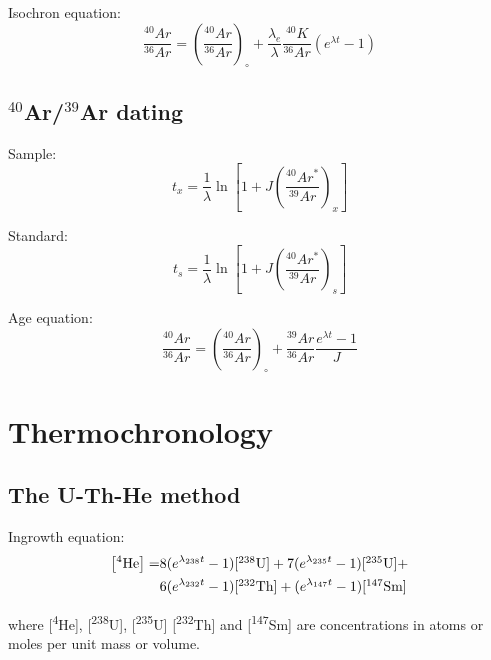 \documentclass{article}
\begin{document}
\begin{multicols}{3}
Isochron equation:
\begin{equation}
\frac{^{40}Ar}{^{36}Ar} = \left(\frac{^{40}Ar}{^{36}Ar}\right)_\circ +
\frac{\lambda_e}{\lambda} \frac{^{40}K}{^{36}Ar} \left( e^{\lambda t} - 1 \right)
\label{eq:K-Ar-isochron}
\end{equation}

\subsection{$^{40}$Ar/$^{39}$Ar dating}
\label{sec:Ar-Ar}

Sample:
\begin{equation}
t_x = \frac{1}{\lambda} \ln\left[
1 + J \left(\frac{^{40}Ar^*}{^{39}Ar}\right)_x 
\right]
\label{eq:Ar-Ar}
\end{equation}

Standard:
\begin{equation}
t_s = \frac{1}{\lambda} \ln\left[
1 + J \left(\frac{^{40}Ar^*}{^{39}Ar}\right)_s 
\right]
\label{eq:J}
\end{equation}

Age equation:
\begin{equation}
\frac{{}^{40}Ar}{{}^{36}Ar} =
\left(\frac{{}^{40}Ar}{{}^{36}Ar}\right)_\circ +
\frac{{}^{39}Ar}{{}^{36}Ar}\frac{e^{\lambda t} - 1}{J}
\label{eq:Ar-Ar-isochron}
\end{equation}

\section{Thermochronology}

\subsection{The U-Th-He method}
\label{sec:U-Th-He}

Ingrowth equation:
\begin{equation}
\begin{split}
  \left[^4\mbox{He}\right] = &
  8 (e^{\lambda_{238}t} - 1) \mbox{[\textsuperscript{238}U]} + 
  7 (e^{\lambda_{235}t} - 1) \mbox{[\textsuperscript{235}U]} + \\
  ~ & 6 (e^{\lambda_{232}t} - 1) \mbox{[\textsuperscript{232}Th]} +
  (e^{\lambda_{147}t} - 1) \mbox{[\textsuperscript{147}Sm]}
\end{split}
\label{eq:U-Th-He}
\end{equation}

where [\textsuperscript{4}He], [\textsuperscript{238}U],
[\textsuperscript{235}U] [\textsuperscript{232}Th] and
[\textsuperscript{147}Sm] are concentrations in atoms or moles per
unit mass or volume.


\end{multicols}
\end{document}
